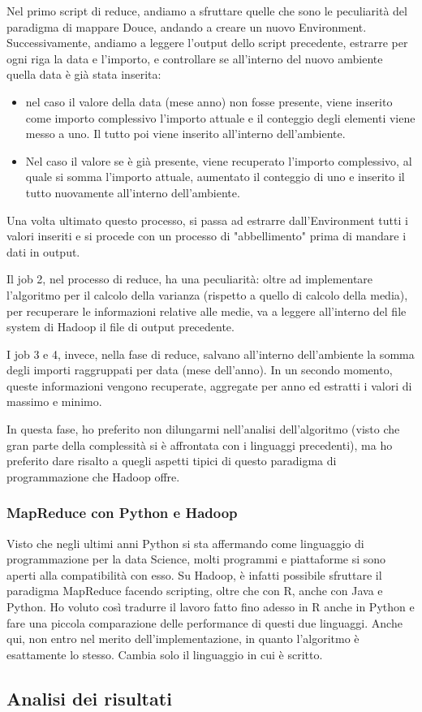 Nel primo script di reduce, andiamo a sfruttare quelle che sono le peculiarità del paradigma di mappare Douce, andando a creare un nuovo Environment. Successivamente, andiamo a leggere l'output dello script precedente, estrarre per ogni riga la data e l'importo, e controllare se all'interno del nuovo ambiente quella data è già stata inserita:
\begin{itemize}
    \item nel caso il valore della data (mese anno) non fosse presente, viene inserito come importo complessivo l'importo attuale e il conteggio degli elementi viene messo a uno. Il tutto poi viene inserito all'interno dell'ambiente.
    \item Nel caso il valore se è già presente, viene recuperato l'importo complessivo, al quale si somma l'importo attuale, aumentato il conteggio di uno e inserito il tutto nuovamente all'interno dell'ambiente.
\end{itemize}
Una volta ultimato questo processo, si passa ad estrarre dall'Environment tutti i valori inseriti e si procede con un processo di "abbellimento" prima di mandare i dati in output.

Il job 2, nel processo di reduce, ha una peculiarità: oltre ad implementare l'algoritmo per il calcolo della varianza (rispetto a quello di calcolo della media), per recuperare le informazioni relative alle medie, va a leggere all'interno del file system di Hadoop il file di output precedente.

I job 3 e 4, invece, nella fase di reduce, salvano all'interno dell'ambiente la somma degli importi raggruppati per data (mese dell'anno). In un secondo momento, queste informazioni vengono recuperate, aggregate per anno ed estratti i valori di massimo e minimo.

In questa fase, ho preferito non dilungarmi nell'analisi dell'algoritmo (visto che gran parte della complessità si è affrontata con i linguaggi precedenti), ma ho preferito dare risalto a quegli aspetti tipici di questo paradigma di programmazione che Hadoop offre.
\subsubsection{MapReduce con Python e Hadoop}
Visto che negli ultimi anni Python si sta affermando come linguaggio di programmazione per la data Science, molti programmi e piattaforme si sono aperti alla compatibilità con esso. Su Hadoop, è infatti possibile sfruttare il paradigma MapReduce facendo scripting, oltre che con R, anche con Java e Python. Ho voluto così tradurre il lavoro fatto fino adesso in R anche in Python e fare una piccola comparazione delle performance di questi due linguaggi. Anche qui, non entro nel merito dell'implementazione, in quanto l'algoritmo è esattamente lo stesso. Cambia solo il linguaggio in cui è scritto.

\subsection{Analisi dei risultati}
